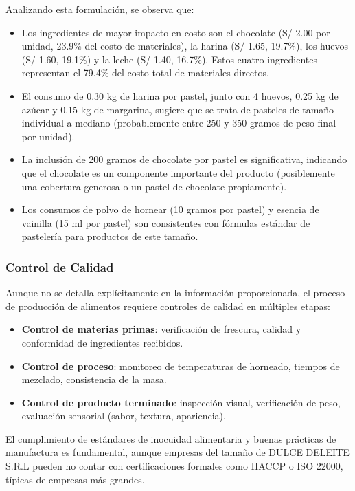 \documentclass[
  stu,
  floatsintext,
  longtable,
  a4paper,
  nolmodern,
  notxfonts,
  notimes,
  12pt,
  colorlinks=true,linkcolor=blue,citecolor=blue,urlcolor=blue]{apa7}
\providecommand{\tightlist}{%
  \setlength{\itemsep}{0pt}\setlength{\parskip}{0pt}}
\begin{document}
Analizando esta formulación, se observa que:

\begin{itemize}
\item
  Los ingredientes de mayor impacto en costo son el chocolate (S/ 2.00
  por unidad, 23.9\% del costo de materiales), la harina (S/ 1.65,
  19.7\%), los huevos (S/ 1.60, 19.1\%) y la leche (S/ 1.40, 16.7\%).
  Estos cuatro ingredientes representan el 79.4\% del costo total de
  materiales directos.
\item
  El consumo de 0.30 kg de harina por pastel, junto con 4 huevos, 0.25
  kg de azúcar y 0.15 kg de margarina, sugiere que se trata de pasteles
  de tamaño individual a mediano (probablemente entre 250 y 350 gramos
  de peso final por unidad).
\item
  La inclusión de 200 gramos de chocolate por pastel es significativa,
  indicando que el chocolate es un componente importante del producto
  (posiblemente una cobertura generosa o un pastel de chocolate
  propiamente).
\item
  Los consumos de polvo de hornear (10 gramos por pastel) y esencia de
  vainilla (15 ml por pastel) son consistentes con fórmulas estándar de
  pastelería para productos de este tamaño.
\end{itemize}

\subsubsection{Control de Calidad}\label{control-de-calidad}

Aunque no se detalla explícitamente en la información proporcionada, el
proceso de producción de alimentos requiere controles de calidad en
múltiples etapas:

\begin{itemize}
\tightlist
\item
  \textbf{Control de materias primas}: verificación de frescura, calidad
  y conformidad de ingredientes recibidos.
\item
  \textbf{Control de proceso}: monitoreo de temperaturas de horneado,
  tiempos de mezclado, consistencia de la masa.
\item
  \textbf{Control de producto terminado}: inspección visual,
  verificación de peso, evaluación sensorial (sabor, textura,
  apariencia).
\end{itemize}

El cumplimiento de estándares de inocuidad alimentaria y buenas
prácticas de manufactura es fundamental, aunque empresas del tamaño de
DULCE DELEITE S.R.L pueden no contar con certificaciones formales como
HACCP o ISO 22000, típicas de empresas más grandes.
\end{document}

